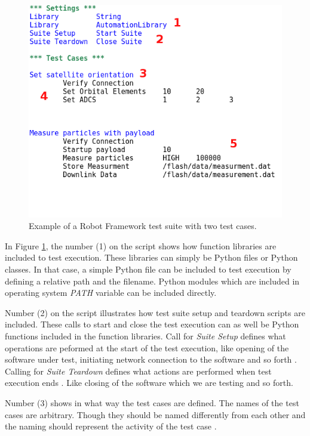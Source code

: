 \documentclass[english,12pt,a4paper,pdftex,elec,utf8]{aaltothesis}
\begin{document}
\begin{figure}[h!]
\centering
\includegraphics[scale=0.55]{robotexamplemod}
\caption{Example of a Robot Framework test suite with two test cases.}
\label{robotexample}
\end{figure}
In Figure \ref{robotexample}, the number (1) on the script shows how function libraries are included to test execution. These libraries can simply be Python files or Python classes. In that case, a simple Python file can be included to test execution by defining a relative path and the filename. Python modules which are included in operating system \textit{PATH} variable can be included directly.\par 
Number (2) on the script illustrates how test suite setup and teardown scripts are included. These calls to start and close the test execution can as well be Python functions included in the function libraries. Call for \textit{Suite Setup} defines what operations are peformed at the start of the test execution, like opening of the software under test, initiating network connection to the software and so forth \cite{robotuserguide}. Calling for \textit{Suite Teardown} defines what actions are performed when test execution ends \cite{robotuserguide}. Like closing of the software which we are testing and so forth.\par 
Number (3) shows in what way the test cases are defined. The names of the test cases are arbitrary. Though they should be named differently from each other and the naming should represent the activity of the test case \cite{robotuserguide}. \par 
\end{document}
